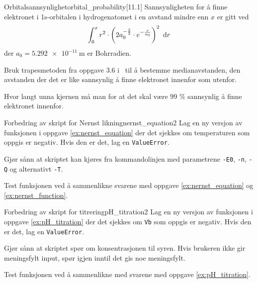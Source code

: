 \begin{exercise}{Orbitalsannsynlighet}{orbital_probability}[11.1]
	Sannsynligheten for å finne elektronet i 1s-orbitalen i hydrogenatomet i en avstand mindre enn $x$ er gitt ved
	\begin{equation*}
		\int_0^x r^2 \cdot \left( 2a_0^{-\frac32}\cdot e^{-\frac{r}{a_0}}\right) ^2\ \dif r
	\end{equation*}
	der $a_0=\SI{5.292e-11}{\meter}$ er Bohrradien.
	
	\subexercise Bruk trapesmetoden fra oppgave 3.6 i \APOSPWP\ til å bestemme medianavstanden, den avstanden der det er like sannsynlig å finne elektronet innenfor som utenfor.
	
	\subexercise Hvor langt unna kjernen må man for at det skal være 99 \% sannsynlig å finne elektronet innenfor.
\end{exercise}

\exercisechapter

\begin{exercise}{Forbedring av skript for Nernst likning}{nernst_equation2}
	\subexercise Lag en ny versjon av funksjonen i oppgave \ref{ex:nernst_equation} der det sjekkes om temperaturen som oppgis er negativ. Hvis den er det, lag en \texttt{ValueError}.
	
	\subexercise Gjør sånn at skriptet kan kjøres fra kommandolinjen med parametrene \texttt{-E0}, \texttt{-n}, \texttt{-Q} og alternativt \texttt{-T}.
	
	Test funksjonen ved å sammenlikne svarene med oppgave \ref{ex:nernst_equation} og \ref{ex:nernst_function}.
\end{exercise}

\begin{exercise}{Forbedring av skript for titrering}{pH_titration2}
	\subexercise Lag en ny versjon av funksjonen i oppgave \ref{ex:pH_titration} der det sjekkes om \texttt{Vb} som oppgis er negativ. Hvis den er det, lag en \texttt{ValueError}.
	
	\subexercise Gjør sånn at skriptet spør om konsentrasjonen til syren. Hvis brukeren ikke gir meningsfylt input, spør igjen inntil det gis noe meningsfylt.
	
	Test funksjonen ved å sammenlikne med svarene med oppgave \ref{ex:pH_titration}.
\end{exercise}

\exercisechapter

